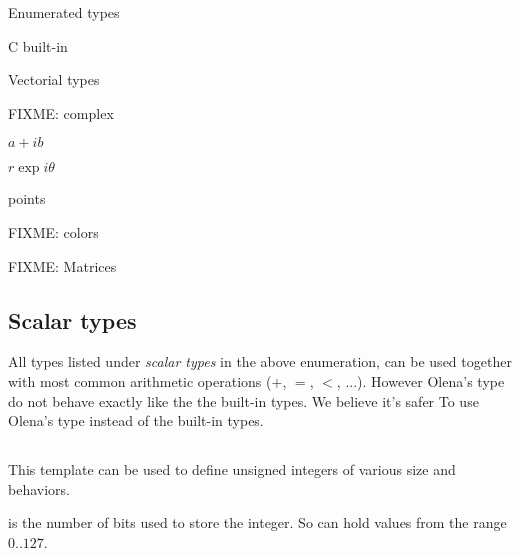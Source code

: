 \begin{list}{--}{}
\item Enumerated types
  \begin{list}{--}{}
  \item C built-in 
  \item {}
  \item {}
  \end{list}
\item Vectorial types
  \begin{list}{--}{}
  \item FIXME: complex
    \begin{list}{--}{}
    \item $a+ib$
    \item $r\exp{i\theta}$
    \end{list}
  \item points
    \begin{list}{--}{}
    \item {}
    \item {}
    \item {}
    \end{list}
  \item {}
  \item FIXME: colors
  \end{list}
\item FIXME: Matrices
\end{list}

\subsection{Scalar types}

All types listed under \emph{scalar types} in the above enumeration,
can be used together with most common arithmetic operations ($+$, $=$,
$<$, ...).  However Olena's type do not behave exactly like the
the built-in types.  We believe it's safer To
use Olena's type instead of the built-in types.

\subsection{}

This template can be used to define unsigned integers of various size
and behaviors.

 is the number of bits used to store the
integer.  So  can hold values from the range $0..127$.

